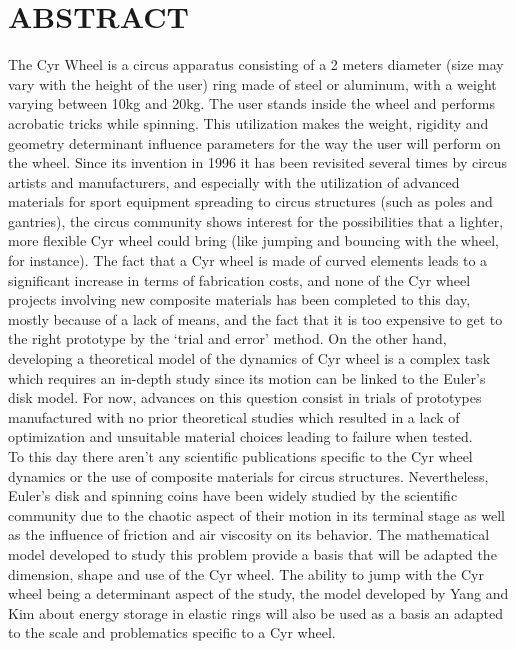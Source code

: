 %

\chapter*{ABSTRACT}\thispagestyle{headings}
%

The Cyr Wheel is a circus apparatus consisting of a 2 meters diameter (size may vary with the height of the user) ring made of steel or aluminum, with a weight varying between 10kg and 20kg. The user stands inside the wheel and performs acrobatic tricks while spinning. This utilization makes the weight, rigidity and geometry determinant influence parameters for the way the user will perform on the wheel. Since its invention in 1996 it has been revisited several times by circus artists and manufacturers, and especially with the utilization of advanced materials for sport equipment spreading to circus structures (such as poles and gantries), the circus community shows interest for the possibilities that a lighter, more flexible Cyr wheel could bring (like jumping and bouncing with the wheel, for instance). The fact that a Cyr wheel is made of curved elements leads to a significant increase in terms of fabrication costs, and none of the Cyr wheel projects involving new composite materials has been completed to this day, mostly because of a lack of means, and the fact that it is too expensive to get to the right prototype by the ‘trial and error’ method. On the other hand, developing a theoretical model of the dynamics of Cyr wheel is a complex task which requires an in-depth study since its motion can be linked to the Euler’s disk model. 
For now, advances on this question consist in trials of prototypes manufactured with no prior theoretical studies which resulted in a lack of optimization and unsuitable material choices leading to failure when tested.\\ 

To this day there aren’t any scientific publications specific to the Cyr wheel dynamics or the use of composite materials for circus structures. Nevertheless, Euler’s disk and spinning coins have been widely studied by the scientific community due to the chaotic aspect of their motion in its terminal stage as well as the influence of friction and air viscosity on its behavior. The mathematical model developed to study this problem provide a basis that will be adapted the dimension, shape and use of the Cyr wheel. The ability to jump with the Cyr wheel being a determinant aspect of the study, the model developed by Yang and Kim about energy storage in elastic rings will also be used as a basis an adapted to the scale and problematics specific to a Cyr wheel.\\

